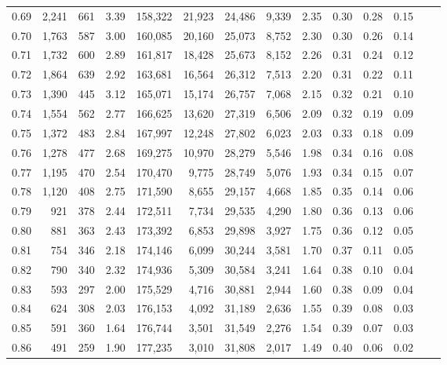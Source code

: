 \begin{tabular}{rrrrrrrrrrrrrr}
0.69 &  2,241 &  661 &    3.39 &  158,322 &   21,923 &  24,486 &   9,339 &  2.35 &  0.30 &  0.28 &      0.15 \\
0.70 &  1,763 &  587 &    3.00 &  160,085 &   20,160 &  25,073 &   8,752 &  2.30 &  0.30 &  0.26 &      0.14 \\
0.71 &  1,732 &  600 &    2.89 &  161,817 &   18,428 &  25,673 &   8,152 &  2.26 &  0.31 &  0.24 &      0.12 \\
0.72 &  1,864 &  639 &    2.92 &  163,681 &   16,564 &  26,312 &   7,513 &  2.20 &  0.31 &  0.22 &      0.11 \\
0.73 &  1,390 &  445 &    3.12 &  165,071 &   15,174 &  26,757 &   7,068 &  2.15 &  0.32 &  0.21 &      0.10 \\
0.74 &  1,554 &  562 &    2.77 &  166,625 &   13,620 &  27,319 &   6,506 &  2.09 &  0.32 &  0.19 &      0.09 \\
0.75 &  1,372 &  483 &    2.84 &  167,997 &   12,248 &  27,802 &   6,023 &  2.03 &  0.33 &  0.18 &      0.09 \\
0.76 &  1,278 &  477 &    2.68 &  169,275 &   10,970 &  28,279 &   5,546 &  1.98 &  0.34 &  0.16 &      0.08 \\
0.77 &  1,195 &  470 &    2.54 &  170,470 &    9,775 &  28,749 &   5,076 &  1.93 &  0.34 &  0.15 &      0.07 \\
0.78 &  1,120 &  408 &    2.75 &  171,590 &    8,655 &  29,157 &   4,668 &  1.85 &  0.35 &  0.14 &      0.06 \\
0.79 &    921 &  378 &    2.44 &  172,511 &    7,734 &  29,535 &   4,290 &  1.80 &  0.36 &  0.13 &      0.06 \\
0.80 &    881 &  363 &    2.43 &  173,392 &    6,853 &  29,898 &   3,927 &  1.75 &  0.36 &  0.12 &      0.05 \\
0.81 &    754 &  346 &    2.18 &  174,146 &    6,099 &  30,244 &   3,581 &  1.70 &  0.37 &  0.11 &      0.05 \\
0.82 &    790 &  340 &    2.32 &  174,936 &    5,309 &  30,584 &   3,241 &  1.64 &  0.38 &  0.10 &      0.04 \\
0.83 &    593 &  297 &    2.00 &  175,529 &    4,716 &  30,881 &   2,944 &  1.60 &  0.38 &  0.09 &      0.04 \\
0.84 &    624 &  308 &    2.03 &  176,153 &    4,092 &  31,189 &   2,636 &  1.55 &  0.39 &  0.08 &      0.03 \\
0.85 &    591 &  360 &    1.64 &  176,744 &    3,501 &  31,549 &   2,276 &  1.54 &  0.39 &  0.07 &      0.03 \\
0.86 &    491 &  259 &    1.90 &  177,235 &    3,010 &  31,808 &   2,017 &  1.49 &  0.40 &  0.06 &      0.02 \\

\end{tabular}
